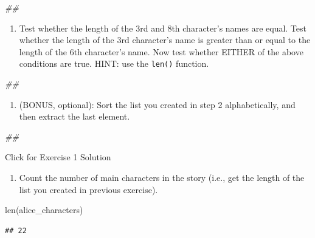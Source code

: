 \documentclass[
]{book}
\newenvironment{Shaded}{\begin{snugshade}}{\end{snugshade}}
\newcommand{\BuiltInTok}[1]{#1}
\newcommand{\CommentTok}[1]{\textcolor[rgb]{0.56,0.35,0.01}{\textit{#1}}}
\newcommand{\NormalTok}[1]{#1}
\providecommand{\tightlist}{%
  \setlength{\itemsep}{0pt}\setlength{\parskip}{0pt}}
\begin{document}
\begin{Shaded}
\begin{Highlighting}[]
\CommentTok{\#\#}
\end{Highlighting}
\end{Shaded}

\begin{enumerate}
\def\labelenumi{\arabic{enumi}.}
\setcounter{enumi}{2}
\tightlist
\item
  Test whether the length of the 3rd and 8th character's names are equal. Test whether the length of
  the 3rd character's name is greater than or equal to the length of the 6th character's name. Now test
  whether EITHER of the above conditions are true. HINT: use the \texttt{len()} function.
\end{enumerate}

\begin{Shaded}
\begin{Highlighting}[]
\CommentTok{\#\#}
\end{Highlighting}
\end{Shaded}

\begin{enumerate}
\def\labelenumi{\arabic{enumi}.}
\setcounter{enumi}{3}
\tightlist
\item
  (BONUS, optional): Sort the list you created in step 2 alphabetically,
  and then extract the last element.
\end{enumerate}

\begin{Shaded}
\begin{Highlighting}[]
\CommentTok{\#\#}
\end{Highlighting}
\end{Shaded}

{Click for Exercise 1 Solution}

\begin{enumerate}
\def\labelenumi{\arabic{enumi}.}
\tightlist
\item
  Count the number of main characters in the story (i.e., get the length of the list you created in previous exercise).
\end{enumerate}

\begin{Shaded}
\begin{Highlighting}[]
\BuiltInTok{len}\NormalTok{(alice\_characters)}
\end{Highlighting}
\end{Shaded}

\begin{verbatim}
## 22
\end{verbatim}
\end{document}
